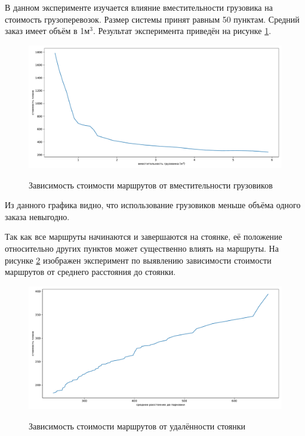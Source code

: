 В данном эксперименте изучается влияние вместительности грузовика на стоимость грузоперевозок. Размер системы принят равным 50 пунктам. Средний заказ имеет объём в 1м$^3$. Результат эксперимента приведён на рисунке \ref{exp:truck_vol}.

\begin{figure}[h!]
	\begin{center}
		{\includegraphics[scale=0.5, angle=0, page=1]{img/research/truck_vol.pdf}}
		\caption{Зависимость стоимости маршрутов от вместительности грузовиков}
		\label{exp:truck_vol}
	\end{center}
\end{figure}

Из данного графика видно, что использование грузовиков меньше объёма одного заказа невыгодно. 

\pagebreak
Так как все маршруты начинаются и завершаются на стоянке, её положение относительно других пунктов может существенно влиять на маршруты. На рисунке \ref{exp:parking_dist} изображен эксперимент по выявлению зависимости стоимости маршрутов от среднего расстояния до стоянки. 

\begin{figure}[h!]
	\begin{center}
		{\includegraphics[scale=0.5, angle=0, page=1]{img/research/parking_dist.pdf}}
		\caption{Зависимость стоимости маршрутов от удалённости стоянки}
		\label{exp:parking_dist}
	\end{center}
\end{figure}

